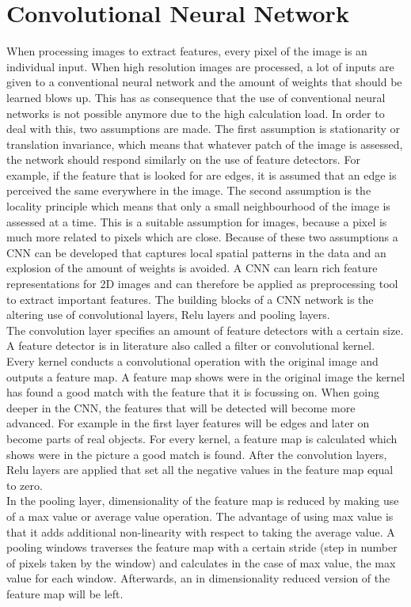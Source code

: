 \documentclass[a4paper,10pt]{article}
\begin{document}
\section{Convolutional Neural Network}
When processing images to extract features, every pixel of the image is an individual input. When high resolution images are processed, a lot of inputs are given to a conventional neural network and the amount of weights that should be learned blows up. This has as consequence that the use of conventional neural networks is not possible anymore due to the high calculation load. In order to deal with this, two assumptions are made. The first assumption is stationarity or translation invariance, which means that whatever patch of the image is assessed, the network should respond similarly on the use of feature detectors. For example, if the feature that is looked for are edges, it is assumed that an edge is perceived the same everywhere in the image. The second assumption is the locality principle which means that only a small neighbourhood of the image is assessed at a time. This is a suitable assumption for images, because a pixel is much more related to pixels which are close. Because of these two assumptions a CNN can be developed that captures local spatial patterns in the data and an explosion of the amount of weights is avoided.
A CNN can learn rich feature representations for 2D images and can therefore be applied as preprocessing tool to extract important features. The building blocks of a CNN network is the altering use of convolutional layers, Relu layers and pooling layers.\\


The convolution layer specifies an amount of feature detectors with a certain size. A feature detector is in literature also called a filter or convolutional kernel. Every kernel conducts a convolutional operation with the original image and outputs a feature map. A feature map shows were in the original image the kernel has found a good match with the feature that it is focussing on. When going deeper in the CNN, the features that will be detected will become more advanced. For example in the first layer features will be edges and later on become parts of real objects. For every kernel, a feature map is calculated which shows were in the picture a good match is found. After the convolution layers, Relu layers are applied that set all the negative values in the feature map equal to zero.\\

In the pooling layer, dimensionality of the feature map is reduced by making use of a max value or average value operation. The advantage of using max value is that it adds additional non-linearity with respect to taking the average value. A pooling windows traverses the feature map with a certain stride (step in number of pixels taken by the window) and calculates in the case of max value, the max value for each window. Afterwards, an in dimensionality reduced version of the feature map will be left.\\
\end{document}
